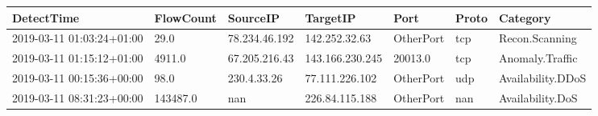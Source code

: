 \begin{tabular}{lllllll}
\toprule
\textbf{DetectTime} & \textbf{FlowCount} & \textbf{SourceIP} & \textbf{TargetIP} & \textbf{Port} & \textbf{Proto} & \textbf{Category} \\
\midrule
2019-03-11 01:03:24+01:00 & 29.0 & 78.234.46.192 & 142.252.32.63 & OtherPort & tcp & Recon.Scanning \\
2019-03-11 01:15:12+01:00 & 4911.0 & 67.205.216.43 & 143.166.230.245 & 20013.0 & tcp & Anomaly.Traffic \\
2019-03-11 00:15:36+00:00 & 98.0 & 230.4.33.26 & 77.111.226.102 & OtherPort & udp & Availability.DDoS \\
2019-03-11 08:31:23+00:00 & 143487.0 & nan & 226.84.115.188 & OtherPort & nan & Availability.DoS \\
\bottomrule
\end{tabular}

